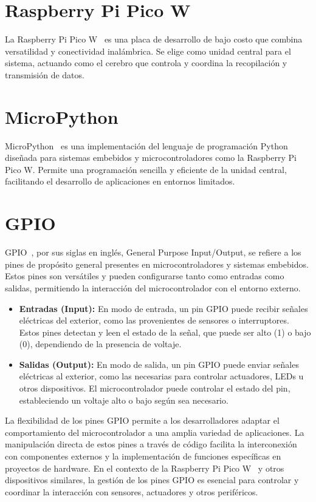\section{Raspberry Pi Pico W}
La Raspberry Pi Pico W~\cite{misc:RPiPicoW} es una placa de desarrollo de bajo costo que combina versatilidad y conectividad inalámbrica. Se elige como unidad central para el sistema, actuando como el cerebro que controla y coordina la recopilación y transmisión de datos.

\section{MicroPython}
MicroPython~\cite{wiki:micropython} es una implementación del lenguaje de programación Python diseñada para sistemas embebidos y microcontroladores como la Raspberry Pi Pico W. Permite una programación sencilla y eficiente de la unidad central, facilitando el desarrollo de aplicaciones en entornos limitados.

\section{GPIO}\label{concepto:GPIO}
GPIO~\cite{misc:gpio}, por sus siglas en inglés, General Purpose Input/Output, se refiere a los pines de propósito general presentes en microcontroladores y sistemas embebidos. Estos pines son versátiles y pueden configurarse tanto como entradas como salidas, permitiendo la interacción del microcontrolador con el entorno externo.
\begin{itemize}
	\item \textbf{Entradas (Input):} En modo de entrada, un pin GPIO puede recibir señales eléctricas del exterior, como las provenientes de sensores o interruptores. Estos pines detectan y leen el estado de la señal, que puede ser alto (1) o bajo (0), dependiendo de la presencia de voltaje.

	\item \textbf{Salidas (Output):} En modo de salida, un pin GPIO puede enviar señales eléctricas al exterior, como las necesarias para controlar actuadores, LEDs u otros dispositivos. El microcontrolador puede controlar el estado del pin, estableciendo un voltaje alto o bajo según sea necesario.
\end{itemize}
La flexibilidad de los pines GPIO permite a los desarrolladores adaptar el comportamiento del microcontrolador a una amplia variedad de aplicaciones. La manipulación directa de estos pines a través de código facilita la interconexión con componentes externos y la implementación de funciones específicas en proyectos de hardware. En el contexto de la Raspberry Pi Pico W~\cite{misc:RPiPicoW} y otros dispositivos similares, la gestión de los pines GPIO es esencial para controlar y coordinar la interacción con sensores, actuadores y otros periféricos.

